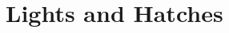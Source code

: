 \documentclass[../main]{subfiles}
\begin{document}
\chapter{Lights and Hatches} \label{chp:}




\end{document}
